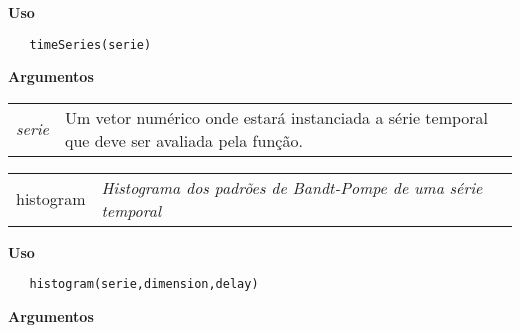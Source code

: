 \hrulefill  

\vspace{0.5cm}

\textbf{Uso}

\begin{lstlisting}
   timeSeries(serie)
\end{lstlisting}

\vspace{0.5cm}

\textbf{Argumentos}

\begin{table}[!ht]
\begin{center}
\begin{tabularx}{\textwidth}{X X}
\hspace{0.5cm} \textit{serie} & Um vetor numérico onde estará instanciada a série temporal que deve ser avaliada pela função.\\
\end{tabularx}
\end{center}
\end{table} 

\hrulefill   

\begin{table}[!ht]
\begin{center}
\begin{tabularx}{\textwidth}{ X X}
\hspace{0.5cm} histogram & \textit{Histograma dos padrões de Bandt-Pompe de uma série temporal}\\
\end{tabularx}
\end{center}
\end{table} 

\vspace{-0.5cm}

\hrulefill  

\vspace{0.5cm}

\textbf{Uso}

\begin{lstlisting}
   histogram(serie,dimension,delay)
\end{lstlisting}

\vspace{0.5cm}

\textbf{Argumentos}

